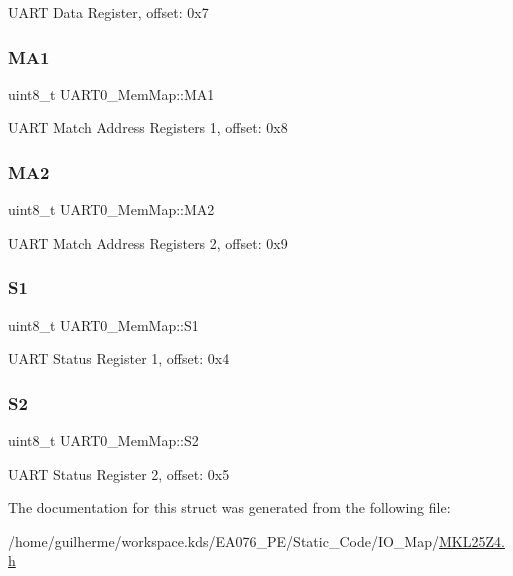 U\+A\+RT Data Register, offset\+: 0x7 \mbox{\label{struct_u_a_r_t0___mem_map_a84dcf3f91ccba87c62fdbf25264ee660}} 
\subsubsection{\texorpdfstring{M\+A1}{MA1}}
{\footnotesize\ttfamily uint8\+\_\+t U\+A\+R\+T0\+\_\+\+Mem\+Map\+::\+M\+A1}

U\+A\+RT Match Address Registers 1, offset\+: 0x8 \mbox{\label{struct_u_a_r_t0___mem_map_a13b6861472650bfda5bd6843fde687a4}} 
\subsubsection{\texorpdfstring{M\+A2}{MA2}}
{\footnotesize\ttfamily uint8\+\_\+t U\+A\+R\+T0\+\_\+\+Mem\+Map\+::\+M\+A2}

U\+A\+RT Match Address Registers 2, offset\+: 0x9 \mbox{\label{struct_u_a_r_t0___mem_map_ac4cfda6527bfad520a55ddeb3d70d669}} 
\subsubsection{\texorpdfstring{S1}{S1}}
{\footnotesize\ttfamily uint8\+\_\+t U\+A\+R\+T0\+\_\+\+Mem\+Map\+::\+S1}

U\+A\+RT Status Register 1, offset\+: 0x4 \mbox{\label{struct_u_a_r_t0___mem_map_ab34f7b8ed424a024a723effca847f5ec}} 
\subsubsection{\texorpdfstring{S2}{S2}}
{\footnotesize\ttfamily uint8\+\_\+t U\+A\+R\+T0\+\_\+\+Mem\+Map\+::\+S2}

U\+A\+RT Status Register 2, offset\+: 0x5 

The documentation for this struct was generated from the following file\+:\begin{DoxyCompactItemize}
\item 
/home/guilherme/workspace.\+kds/\+E\+A076\+\_\+\+P\+E/\+Static\+\_\+\+Code/\+I\+O\+\_\+\+Map/\hyperlink{_m_k_l25_z4_8h}{M\+K\+L25\+Z4.\+h}\end{DoxyCompactItemize}
